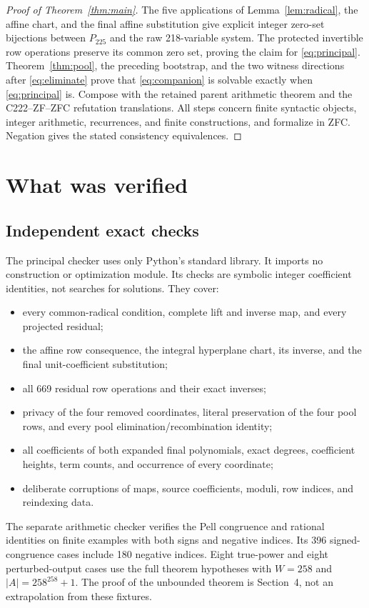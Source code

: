 \documentclass[11pt,letterpaper]{article}
\theoremstyle{definition}\newtheorem{definition}[theorem]{Definition}
\theoremstyle{remark}\newtheorem{remark}[theorem]{Remark}
\begin{document}
\begin{proof}[Proof of Theorem~\ref{thm:main}]
The five applications of Lemma~\ref{lem:radical}, the affine chart, and
the final affine substitution give explicit integer zero-set bijections
between $P_{225}$ and the raw 218-variable system. The protected
invertible row operations preserve its common zero set, proving the
claim for \eqref{eq:principal}. Theorem~\ref{thm:pool}, the preceding
bootstrap, and the two witness directions after
\eqref{eq:eliminate} prove that \eqref{eq:companion} is solvable exactly
when \eqref{eq:principal} is. Compose with the retained parent arithmetic
theorem and the C222--ZF--ZFC refutation translations. All steps concern
finite syntactic objects, integer arithmetic, recurrences, and finite
constructions, and formalize in ZFC. Negation gives the stated
consistency equivalences.
\end{proof}

\section{What was verified}

\subsection{Independent exact checks}

The principal checker uses only Python's standard library. It imports no
construction or optimization module. Its checks are symbolic integer
coefficient identities, not searches for solutions. They cover:
\begin{itemize}
\item every common-radical condition, complete lift and inverse map,
 and every projected residual;
\item the affine row consequence, the integral hyperplane chart, its
 inverse, and the final unit-coefficient substitution;
\item all 669 residual row operations and their exact inverses;
\item privacy of the four removed coordinates, literal preservation of
 the four pool rows, and every pool elimination/recombination identity;
\item all coefficients of both expanded final polynomials, exact degrees,
 coefficient heights, term counts, and occurrence of every coordinate;
\item deliberate corruptions of maps, source coefficients, moduli,
 row indices, and reindexing data.
\end{itemize}
The separate arithmetic checker verifies the Pell congruence and rational
identities on finite examples with both signs and negative indices. Its
396 signed-congruence cases include 180 negative indices. Eight true-power
and eight perturbed-output cases use the full theorem hypotheses with
$W=258$ and $|A|=258^{258}+1$. The proof of the unbounded theorem is
Section~4, not an extrapolation from these fixtures.
\end{document}
